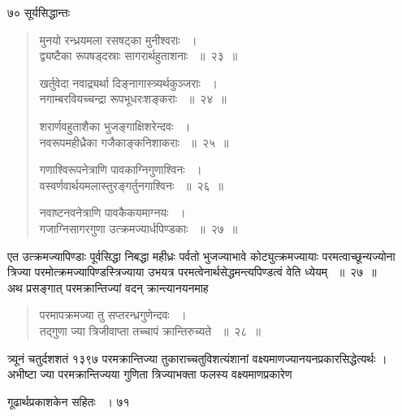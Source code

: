 \documentclass[11pt, openany]{book}
\begin{document}
\noindent ७० \hspace{4cm} सूर्यसिद्धान्तः
\vspace{1cm}
\begin{quote}

{\ssi मुनयो रन्ध्रयमला रसषट्का मुनीश्वराः ~।\\
द्व्यष्टैका रूपषड्दस्राः सागरार्थहुताशनाः ~॥~२३~॥

खर्तुवेदा नवाद्र्यर्था दिङ्नागास्त्र्यर्थकुञ्जराः ~।\\
नगाम्बरवियच्चन्द्रा रूपभूधरःशङ्कराः ~॥~२४~॥

शरार्णवहुताशैका भुजङ्गाक्षिशरेन्दवः ~।\\
नवरूपमहीध्रैका गजैकाङ्कनिशाकराः ~॥~२५~॥

गणाश्विरूपनेत्राणि पावकाग्निगुणाश्विनः ~।\\
वस्वर्णवार्थयमलास्तुरङ्गर्तुनगाश्विनः ~॥~२६~॥

नवाष्टनवनेत्राणि पावकैकयमाग्नयः ~।\\
गजाग्निसागरगुणा उत्क्रमज्यार्धपिण्डकाः ~॥~२७~॥}
\end{quote}
\begin{sloppypar}

एत उत्क्रमज्यापिण्डाः पूर्वसिद्धा निबद्धा महीध्रः पर्वतो भुजज्याभावे कोट्युत्क्रमज्यायाः परमत्वाच्छून्यज्योना त्रिज्या परमोत्क्रमज्यापिण्डस्त्रिज्याया उभयत्र परमत्वेनार्थसेद्धमन्त्यपिण्डत्वं वेति ध्येयम् ~॥~२७~॥\\
\noindent अथ प्रसङ्गात् परमक्रान्तिज्यां वदन् क्रान्त्यानयनमाह\textendash
\end{sloppypar}
\begin{quote}

{\ssi परमापक्रमज्या तु सप्तरन्ध्रगुणेन्दवः ~।\\
तद्गुणा ज्या त्रिजीवाप्ता तच्चापं क्रान्तिरुच्यते ~॥~२८~॥}
\end{quote}
\begin{sloppypar}

त्र्यूनं चतुर्दशशतं १३९७ परमक्रान्तिज्या तुकाराच्चतुविशत्यंशानां वक्ष्यमाणज्यानयनप्रकारसिद्धेत्यर्थः । अभीष्टा ज्या परमक्रान्तिज्यया गुणिता त्रिज्याभक्ता फलस्य वक्ष्यमाणप्रकारेण
\end{sloppypar}

\newpage

\hspace{3cm} गूढार्थप्रकाशकेन सहितः ~। \hfill ७१
\vspace{1cm}
\end{document}
